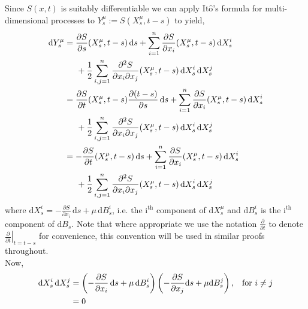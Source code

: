 \documentclass[a4paper,12pt,draft]{report}
\theoremstyle{remark}
\theoremstyle{definition}
\begin{document}
{
Since $S(x, t)$ is suitably differentiable we can apply It$\mathrm{\hat{o}}$'s formula for multi-dimensional processes to $Y^{\mu}_{s} := S(X^{\mu}_{s}, t - s)$ to yield,
\begin{align}
\mathrm{d}Y^{\mu}_{s} & = \frac{\partial S}{\partial s}(X^{\mu}_{s}, t - s)\,\mathrm{d}s + \sum_{i = 1}^n \frac{\partial S}{\partial x_{i}}(X^{\mu}_{s}, t - s)\,\mathrm{d}X^{i}_{s}\nonumber\\
& \hspace{0.5cm} + \frac{1}{2}\sum_{i, j = 1}^{n} \frac{\partial^2 S}{\partial x_{i} \partial x_{j}}(X^{\mu}_{s}, t - s)\,\mathrm{d}X^{i}_{s}\,\mathrm{d}X_s^j\nonumber\\
& = \frac{\partial S}{\partial t}(X^{\mu}_{s}, t - s)\frac{\partial(t - s)}{\partial s}\,\mathrm{d}s + \sum_{i = 1}^n \frac{\partial S}{\partial x_{i}}(X^{\mu}_{s}, t - s)\,\mathrm{d}X^{i}_{s}\nonumber\\
& \hspace{0.5cm} + \frac{1}{2}\sum_{i, j = 1}^{n} \frac{\partial^2 S}{\partial x_{i} \partial x_{j}}(X^{\mu}_{s}, t - s)\,\mathrm{d}X^{i}_{s}\,\mathrm{d}X_s^j\nonumber\\
& = -\frac{\partial S}{\partial t}(X^{\mu}_{s}, t - s)\,\mathrm{d}s + \sum_{i = 1}^n \frac{\partial S}{\partial x_{i}}(X^{\mu}_{s}, t - s)\,\mathrm{d}X^{i}_{s}\nonumber\\
& \hspace{0.5cm} + \frac{1}{2}\sum_{i, j = 1}^{n} \frac{\partial^2 S}{\partial x_{i} \partial x_{j}}(X^{\mu}_{s}, t - s)\,\mathrm{d}X^{i}_{s}\,\mathrm{d}X_s^j\nonumber
\end{align}
where $\mathrm{d}X^{i}_{s} = -\frac{\partial S}{\partial x_{i}}\,\mathrm{d}s + \mu\,\mathrm{d}B_s^i$, i.e. the $\mathrm{i^{th}}$ component of $\mathrm{d}X^{\mu}_{s}$ and $\mathrm{d}B_s^i$ is the $\mathrm{i^{th}}$ component of $\mathrm{d}B_{s}$.  Note that where appropriate we use the notation $\frac{\partial}{\partial t}$ to denote $\left.\frac{\partial}{\partial t}\right|_{t = t - s}$ for convenience, this convention will be used in similar proofs throughout.
\\Now, 
\begin{align}
\mathrm{d}X^{i}_{s}\,\mathrm{d}X_s^j & = \left(-\frac{\partial S}{\partial x_{i}}\,\mathrm{d}s + \mu\,\mathrm{d}B_s^i\right)\left(-\frac{\partial S}{\partial x_{j}}\mathrm{d}s + \mu\mathrm{d}B_s^j\right), \hspace{0.3cm} \text{for } i \ne j \nonumber \\
& = 0 \nonumber
\end{align}
}
\end{document}
